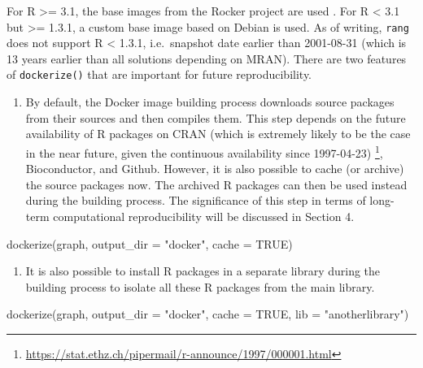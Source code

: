 \documentclass[
  10pt,
  letterpaper,
]{article}
\newenvironment{Shaded}{\begin{snugshade}}{\end{snugshade}}
\newcommand{\AttributeTok}[1]{\textcolor[rgb]{0.40,0.45,0.13}{#1}}
\newcommand{\ConstantTok}[1]{\textcolor[rgb]{0.56,0.35,0.01}{#1}}
\newcommand{\FunctionTok}[1]{\textcolor[rgb]{0.28,0.35,0.67}{#1}}
\newcommand{\NormalTok}[1]{\textcolor[rgb]{0.00,0.23,0.31}{#1}}
\newcommand{\StringTok}[1]{\textcolor[rgb]{0.13,0.47,0.30}{#1}}
\providecommand{\tightlist}{%
  \setlength{\itemsep}{0pt}\setlength{\parskip}{0pt}}\usepackage{longtable,booktabs,array}
\begin{document}
For R \textgreater= 3.1, the base images from the Rocker project are
used \citep{boettiger:2017:IR}. For R \textless{} 3.1 but \textgreater=
1.3.1, a custom base image based on Debian is used. As of writing,
\texttt{rang} does not support R \textless{} 1.3.1, i.e.~snapshot date
earlier than 2001-08-31 (which is 13 years earlier than all solutions
depending on MRAN). There are two features of \texttt{dockerize()} that
are important for future reproducibility.

\begin{enumerate}
\def\labelenumi{\arabic{enumi}.}
\tightlist
\item
  By default, the Docker image building process downloads source
  packages from their sources and then compiles them. This step depends
  on the future availability of R packages on CRAN (which is extremely
  likely to be the case in the near future, given the continuous
  availability since 1997-04-23) \footnote{\url{https://stat.ethz.ch/pipermail/r-announce/1997/000001.html}},
  Bioconductor, and Github. However, it is also possible to cache (or
  archive) the source packages now. The archived R packages can then be
  used instead during the building process. The significance of this
  step in terms of long-term computational reproducibility will be
  discussed in Section 4.
\end{enumerate}

\begin{Shaded}
\begin{Highlighting}[]
\FunctionTok{dockerize}\NormalTok{(graph, }\AttributeTok{output\_dir =} \StringTok{"docker"}\NormalTok{, }\AttributeTok{cache =} \ConstantTok{TRUE}\NormalTok{)}
\end{Highlighting}
\end{Shaded}

\begin{enumerate}
\def\labelenumi{\arabic{enumi}.}
\setcounter{enumi}{1}
\tightlist
\item
  It is also possible to install R packages in a separate library during
  the building process to isolate all these R packages from the main
  library.
\end{enumerate}

\begin{Shaded}
\begin{Highlighting}[]
\FunctionTok{dockerize}\NormalTok{(graph, }\AttributeTok{output\_dir =} \StringTok{"docker"}\NormalTok{, }\AttributeTok{cache =} \ConstantTok{TRUE}\NormalTok{,}
          \AttributeTok{lib =} \StringTok{"anotherlibrary"}\NormalTok{)}
\end{Highlighting}
\end{Shaded}
\end{document}
